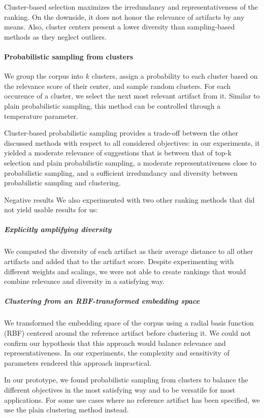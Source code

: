 Cluster-based selection maximizes the irredundancy and representativeness of the ranking.
On the downside, it does not honor the relevance of artifacts by any means.
Also, cluster centers present a lower diversity than sampling-based methods as they neglect outliers.

\paragraph{Probabilistic sampling from clusters}
We group the corpus into $k$ clusters, assign a probability to each cluster based on the relevance score of their center, and sample random clusters.
For each occurence of a cluster, we select the next most relevant artifact from it.
Similar to plain probabilistic sampling, this method can be controlled through a temperature parameter.

Cluster-based probabilistic sampling provides a trade-off between the other discussed methods with respect to all considered objectives:
in our experiments, it yielded a moderate relevance of suggestions that is between that of top-k selection and plain probabilistic sampling, a moderate representativeness close to probabilistic sampling, and a sufficient irredundancy and diversity between probabilistic sampling and clustering.

\begin{genericbox}{Negative results}
	We also experimented with two other ranking methods that did not yield usable results for us:

	\subparagraph{Explicitly amplifying diversity}
	We computed the diversity of each artifact as their average distance to all other artifacts and added that to the artifact score.
	Despite experimenting with different weights and scalings, we were not able to create rankings that would combine relevance and diversity in a satisfying way.

	\subparagraph{Clustering from an RBF-transformed embedding space}
	We transformed the embedding space of the corpus using a radial basis function (RBF) centered around the reference artifact before clustering it.
	We could not confirm our hypothesis that this approach would balance relevance and representativeness.
	In our experiments, the complexity and sensitivity of parameters rendered this approach impractical.
\end{genericbox}

\ParSep

In our prototype, we found probabilistic sampling from clusters to balance the different objectives in the most satisfying way and to be versatile for most applications.
For some use cases where no reference artifact has been specified, we use the plain clustering method instead.

